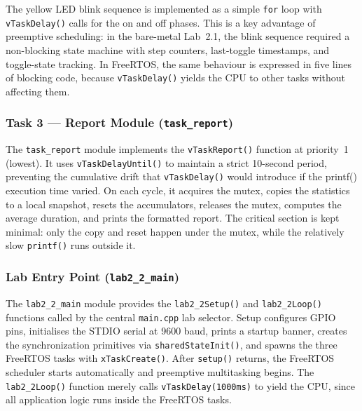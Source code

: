 The yellow LED blink sequence is implemented as a simple \texttt{for} loop with \texttt{vTaskDelay()} calls for the on and off phases. This is a key advantage of preemptive scheduling: in the bare-metal Lab~2.1, the blink sequence required a non-blocking state machine with step counters, last-toggle timestamps, and toggle-state tracking. In FreeRTOS, the same behaviour is expressed in five lines of blocking code, because \texttt{vTaskDelay()} yields the CPU to other tasks without affecting them.

\subsubsection{Task 3 --- Report Module (\texttt{task\_report})}

The \texttt{task\_report} module implements the \texttt{vTaskReport()} function at priority~1 (lowest). It uses \texttt{vTaskDelayUntil()} to maintain a strict 10-second period, preventing the cumulative drift that \texttt{vTaskDelay()} would introduce if the printf() execution time varied. On each cycle, it acquires the mutex, copies the statistics to a local snapshot, resets the accumulators, releases the mutex, computes the average duration, and prints the formatted report. The critical section is kept minimal: only the copy and reset happen under the mutex, while the relatively slow \texttt{printf()} runs outside it.

\subsubsection{Lab Entry Point (\texttt{lab2\_2\_main})}

The \texttt{lab2\_2\_main} module provides the \texttt{lab2\_2Setup()} and \texttt{lab2\_2Loop()} functions called by the central \texttt{main.cpp} lab selector. Setup configures GPIO pins, initialises the STDIO serial at 9600 baud, prints a startup banner, creates the synchronization primitives via \texttt{sharedStateInit()}, and spawns the three FreeRTOS tasks with \texttt{xTaskCreate()}. After \texttt{setup()} returns, the FreeRTOS scheduler starts automatically and preemptive multitasking begins. The \texttt{lab2\_2Loop()} function merely calls \texttt{vTaskDelay(1000ms)} to yield the CPU, since all application logic runs inside the FreeRTOS tasks.
